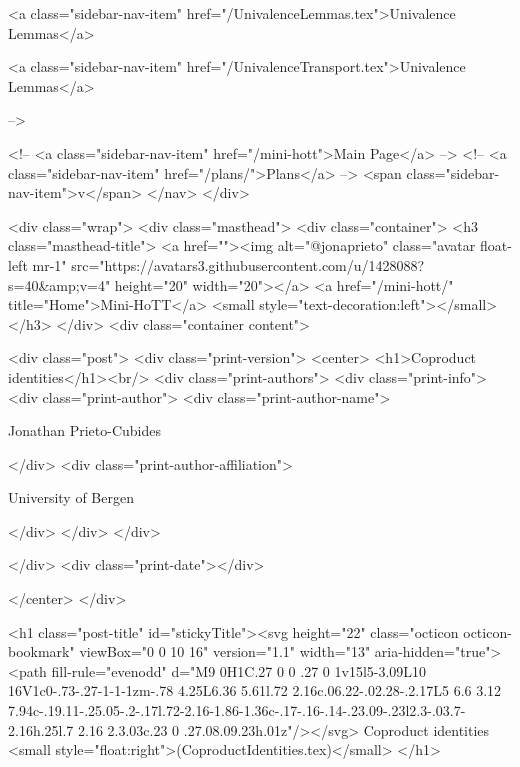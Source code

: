       
    
      
        
          <a class="sidebar-nav-item" href="/UnivalenceLemmas.tex">Univalence Lemmas</a>
        
      
    
      
        
          <a class="sidebar-nav-item" href="/UnivalenceTransport.tex">Univalence Lemmas</a>
        
      
     -->

    <!-- <a class="sidebar-nav-item" href="/mini-hott">Main Page</a> -->
    <!-- <a class="sidebar-nav-item" href="/plans/">Plans</a> -->
    <span class="sidebar-nav-item">v</span>
  </nav>
</div>

    <div class="wrap">
      <div class="masthead">
        <div class="container">
          <h3 class="masthead-title">
            <a href=""><img alt="@jonaprieto" class="avatar float-left mr-1" src="https://avatars3.githubusercontent.com/u/1428088?s=40&amp;v=4" height="20" width="20"></a>
            <a href="/mini-hott/" title="Home">Mini-HoTT</a>
            <small style="text-decoration:left"></small>
          </h3>
        </div>
      <div class="container content">
        







<div class="post">
  <div class="print-version">
    <center>
      <h1>Coproduct identities</h1><br/>
        <div class="print-authors">
          <div class="print-info">
            <div class="print-author">
              <div class="print-author-name">
                
                  Jonathan Prieto-Cubides
                
              </div>
              <div class="print-author-affiliation">
                
                  University of Bergen
                
                </div>
            </div>
          </div>
          
          
        </div>
        <div class="print-date"></div>
        
        
    </center>
  </div>

  

  <h1 class="post-title" id="stickyTitle"><svg height="22" class="octicon octicon-bookmark" viewBox="0 0 10 16" version="1.1" width="13" aria-hidden="true"><path fill-rule="evenodd" d="M9 0H1C.27 0 0 .27 0 1v15l5-3.09L10 16V1c0-.73-.27-1-1-1zm-.78 4.25L6.36 5.61l.72 2.16c.06.22-.02.28-.2.17L5 6.6 3.12 7.94c-.19.11-.25.05-.2-.17l.72-2.16-1.86-1.36c-.17-.16-.14-.23.09-.23l2.3-.03.7-2.16h.25l.7 2.16 2.3.03c.23 0 .27.08.09.23h.01z"/></svg> Coproduct identities <small style="float:right">(CoproductIdentities.tex)</small>
  </h1>

